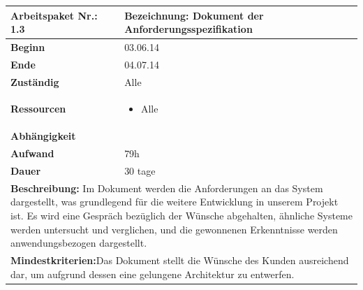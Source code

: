 \documentclass[fontsize=12pt,paper=a4,twoside]{scrartcl}
\begin{document}
\begin{verbatim} 
\end{verbatim}

\begin{tabular}{|p{5.3cm}|p{9.7cm}|}\hline
	\textbf{Arbeitspaket Nr.:} 1.3 & \textbf{Bezeichnung:} Dokument der Anforderungsspezifikation\\ \hline \hline
	\textbf{Beginn} & 03.06.14\\ \hline
	\textbf{Ende} & 04.07.14\\ \hline
	\textbf{Zuständig} & Alle\\ \hline
	\textbf{Ressourcen} & \begin{itemize}
		\item Alle
	\end{itemize}    \\ \hline
	\textbf{Abhängigkeit} &\\ \hline
	\textbf{Aufwand} & 79h\\ \hline
	\textbf{Dauer} & 30 tage\\ \hline
	\multicolumn{2}{|p{15cm}|}{\textbf{Beschreibung:} Im Dokument werden die Anforderungen an das System dargestellt, was grundlegend für die weitere Entwicklung in unserem Projekt ist. Es wird eine Gespräch bezüglich der Wünsche abgehalten, ähnliche Systeme werden untersucht und verglichen, und die gewonnenen Erkenntnisse werden anwendungsbezogen dargestellt.\newline   }\\ \hline
	\multicolumn{2}{|p{15cm}|}{\textbf{Mindestkriterien:}\newline Das Dokument stellt die Wünsche des Kunden ausreichend dar, um aufgrund dessen eine gelungene Architektur zu entwerfen.}\\ \hline
\end{tabular}

\begin{verbatim} 
\end{verbatim}
\end{document}
